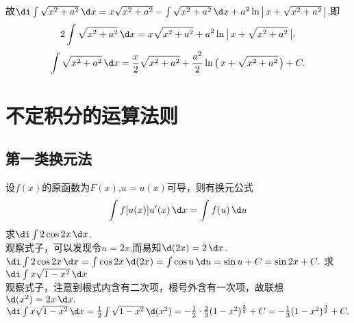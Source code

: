 故$\di\int\sqrt{x^2+a^2} \,\d x=x\sqrt{x^2+a^2}-\int\sqrt{x^2+a^2} \,\d x+a^2\ln\big|\, x+\sqrt{x^2+a^2}\,\big|$,即
\begin{equation}
	\nonumber
	2\int\sqrt{x^2+a^2} \,\d x=x\sqrt{x^2+a^2}+a^2\ln\big|\, x+\sqrt{x^2+a^2}\,\big|.
\end{equation}
\begin{equation}
	\nonumber
	\int \sqrt{x^2+a^2} \,\d x=\frac{x}{2}\sqrt{x^2+a^2}+\frac{a^2}{2}\ln\big( \, x+\sqrt{x^2+a^2}\,\big)+C.
\end{equation}
\section{不定积分的运算法则}
\label{sec:1}
\subsection{第一类换元法}
\theorem[第一类换元法]
 设$f(x)$的原函数为$F(x)$,$u=u(x)$可导，则有换元公式
\begin{equation}
	\int f[u(x)]u'(x) \,\d x=\int f(u) \,\d u
\end{equation}
\vspace{1em}
\examples 求$\di\int 2\cos 2x \, \d x$.\\
\solvereason 观察式子，可以发现令$u=2x$,而易知$\d(2x)=2 \,\d x$.\\
\solve $\di\int 2\cos 2x \,\d x=\int \cos 2x \,\d(2x)=\int \cos u \,\d u=\sin u+C=\sin 2x+C.$\sj
\warn[\kg 在普通的积分式中通常有一个隐含条件:$(x)'=1$,有时候这是构造的关键，就像本题应完整写为：
\begin{equation}
	\nonumber
	\int 2\cos 2x \,\d x=\int \cos 2x(2x)' \,\d x=\int \cos 2x \,\d(2x)=\int \cos u \,\d u=\sin u+C=\sin 2x+C.
	\end{equation}
但因为书写的简洁性与方便性，可以省略$(x)'=1$的步骤，$(x)'=1$的更多应用见第二类换元法。]
\examples 求$\di\int x\sqrt{1-x^2} \,\d x$\\
\solvereason 观察式子，注意到根式内含有二次项，根号外含有一次项，故联想$\d(x^2)=2x \,\d x.$\\
\solve $\di\int x\sqrt{1-x^2} \,\d x=\frac{1}{2}\int \sqrt{1-x^2} \,\d(x^2)=-\frac{1}{2}\cdot\frac{2}{3}(1-x^2)^{\frac{3}{2}}+C=-\frac{1}{3}(1-x^2)^{\frac{3}{2}}+C.$\sj
{}
